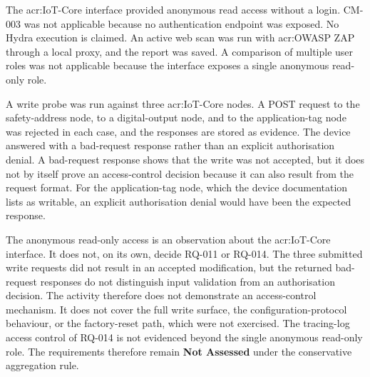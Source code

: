 The \gls{acr:IoT}-Core interface provided anonymous read access without a login. CM-003 was not applicable because no authentication endpoint was exposed. No Hydra execution is claimed. An active web scan was run with \gls{acr:OWASP} ZAP through a local proxy, and the report was saved. A comparison of multiple user roles was not applicable because the interface exposes a single anonymous read-only role.

A write probe was run against three \gls{acr:IoT}-Core nodes. A POST request to the safety-address node, to a digital-output node, and to the application-tag node was rejected in each case, and the responses are stored as evidence. The device answered with a bad-request response rather than an explicit authorisation denial. A bad-request response shows that the write was not accepted, but it does not by itself prove an access-control decision because it can also result from the request format. For the application-tag node, which the device documentation lists as writable, an explicit authorisation denial would have been the expected response.

The anonymous read-only access is an observation about the \gls{acr:IoT}-Core interface. It does not, on its own, decide RQ-011 or RQ-014. The three submitted write requests did not result in an accepted modification, but the returned bad-request responses do not distinguish input validation from an authorisation decision. The activity therefore does not demonstrate an access-control mechanism. It does not cover the full write surface, the configuration-protocol behaviour, or the factory-reset path, which were not exercised. The tracing-log access control of RQ-014 is not evidenced beyond the single anonymous read-only role. The requirements therefore remain \textbf{Not Assessed} under the conservative aggregation rule.


